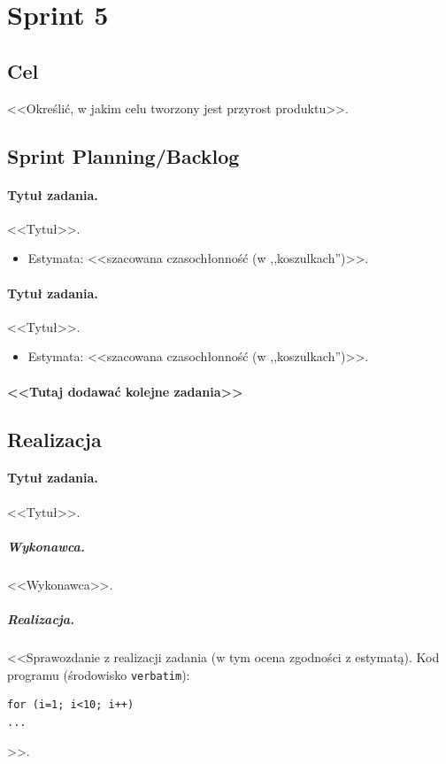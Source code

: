 \documentclass[a4paper]{article}
\begin{document}
\section{Sprint 5}

\subsection{Cel} <<Określić, w jakim celu tworzony jest przyrost produktu>>.

\subsection{Sprint Planning/Backlog}

\paragraph{Tytuł zadania.} <<Tytuł>>.
\begin{itemize}
\item Estymata: <<szacowana czasochłonność (w ,,koszulkach'')>>.
\end{itemize}

\paragraph{Tytuł zadania.} <<Tytuł>>.
\begin{itemize}
\item Estymata: <<szacowana czasochłonność (w ,,koszulkach'')>>.
\end{itemize}

\paragraph{<<Tutaj dodawać kolejne zadania>>}

\subsection{Realizacja}

\paragraph{Tytuł zadania.} <<Tytuł>>.
\subparagraph{Wykonawca.} <<Wykonawca>>.
\subparagraph{Realizacja.} <<Sprawozdanie z realizacji zadania (w tym ocena zgodności z estymatą). Kod programu (środowisko \texttt{verbatim}): \begin{verbatim}
for (i=1; i<10; i++)
...
\end{verbatim}>>.
\end{document}
